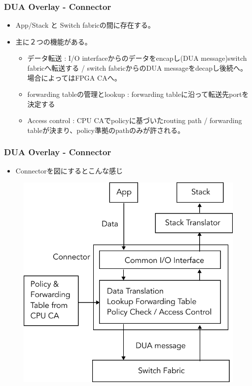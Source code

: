 \documentclass[dvipdfmx,9pt,notheorems]{beamer}
\theoremstyle{definition}
\begin{document}
%
\begin{frame}\frametitle{DUA Overlay - Connector}
	\begin{itemize}
		\item App/Stack と Switch fabricの間に存在する。
		\item 主に２つの機能がある。
			\begin{itemize}
				\item データ転送 : I/O interfaceからのデータをencapし(DUA message)switch fabricへ転送する / switch fabricからのDUA messageをdecapし後続へ。場合によってはFPGA CAへ。
				\item forwarding tableの管理とlookup : forwarding tableに沿って転送先portを決定する
				\item Access control : CPU CAでpolicyに基づいたrouting path / forwarding tableが決まり、policy準拠のpathのみが許される。
			\end{itemize}
	\end{itemize}
\pnote{
}
\end{frame}


\begin{frame}\frametitle{DUA Overlay - Connector}
	\begin{itemize}
		\item Connectorを図にするとこんな感じ
		\end{itemize}
  \begin{figure}[htb]
		\includegraphics[scale=0.5]{fig/ez_DUA_DataPlane_Connector.pdf}
  \end{figure}
\pnote{
}
\end{frame}
\end{document}
